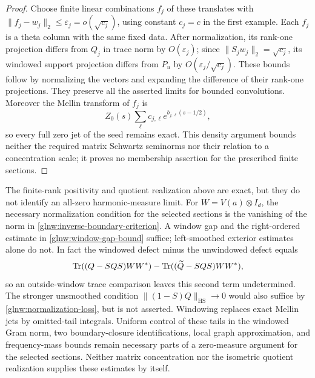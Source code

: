 \begin{proof}
Choose finite linear combinations $f_j$ of these translates with
$\|f_j-w_j\|_2\leq\varepsilon_j=o(\sqrt{c_j})$, using constant
$c_j=c$ in the first example. Each $f_j$ is a theta
column with the same fixed data. After normalization, its
rank-one projection differs from $Q_j$ in trace norm by
$O(\varepsilon_j)$; since $\|S_jw_j\|_2=\sqrt{c_j}$, its
windowed support projection differs from $P_u$ by
$O(\varepsilon_j/\sqrt{c_j})$. These bounds follow by normalizing
the vectors and expanding the difference of their rank-one
projections. They preserve all the asserted limits for bounded
convolutions. Moreover the Mellin transform of $f_j$ is
\[
 Z_0(s)\sum_\ell c_{j,\ell}e^{b_{j,\ell}(s-1/2)},
\]
so every full zero jet of the seed remains exact. This density
argument bounds neither the required matrix Schwartz seminorms
nor their relation to a concentration scale; it proves no
membership assertion for the prescribed finite sections.
\end{proof}

The finite-rank positivity and quotient realization above are exact,
but they do not identify an all-zero harmonic-measure limit.
For $W=V(a)\otimes I_d$, the necessary normalization condition for the
selected sections is the vanishing of the norm in
\eqref{glnw:inverse-boundary-criterion}. A window gap and the
right-ordered estimate in \eqref{glnw:window-gap-bound} suffice;
left-smoothed exterior estimates alone do not. In fact the
windowed defect minus the unwindowed defect equals
\[
 \operatorname{Tr}((Q-SQS)WW^*)-\operatorname{Tr}((\widetilde Q-SQS)WW^*),
\]
so an outside-window trace comparison leaves this second term
undetermined. The stronger unsmoothed condition
$\|(1-S)Q\|_{\mathrm{HS}}\to0$ would also suffice by
\eqref{glnw:normalization-loss}, but is not asserted.
Windowing replaces exact Mellin jets by omitted-tail integrals.
Uniform control of these tails in the windowed Gram norm,
two boundary-closure identifications, local graph approximation,
and frequency-mass bounds remain necessary parts of a zero-measure
argument for the selected sections. Neither matrix concentration
nor the isometric quotient realization supplies these estimates
by itself.
